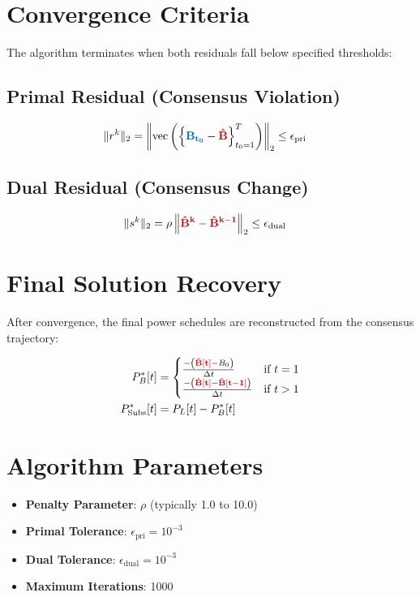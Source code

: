 \documentclass[11pt]{article}
\newcommand{\blueB}[1]{\textcolor{bluevar}{\mathbf{#1}}}      %
\newcommand{\redBhat}[1]{\textcolor{redvar}{\mathbf{#1}}}     %
\begin{document}
\section{Convergence Criteria}

The algorithm terminates when both residuals fall below specified thresholds:

\subsection{Primal Residual (Consensus Violation)}
\begin{align}
\|r^k\|_2 &= \left\| \text{vec}\left( \left\{ \blueB{B_{t_0}} - \redBhat{\hat{B}} \right\}_{t_0=1}^T \right) \right\|_2 \leq \epsilon_{\text{pri}}
\end{align}

\subsection{Dual Residual (Consensus Change)}
\begin{align}
\|s^k\|_2 &= \rho \left\| \redBhat{\hat{B}^k} - \redBhat{\hat{B}^{k-1}} \right\|_2 \leq \epsilon_{\text{dual}}
\end{align}

\section{Final Solution Recovery}

After convergence, the final power schedules are reconstructed from the consensus trajectory:

\begin{align}
P_{B}^*[t] &= 
\begin{cases}
\frac{-\left(\redBhat{\hat{B}[t]} - B_0\right)}{\Delta t} & \text{if } t = 1 \\
\frac{-\left(\redBhat{\hat{B}[t]} - \redBhat{\hat{B}[t-1]}\right)}{\Delta t} & \text{if } t > 1
\end{cases} \\
P_{\text{Subs}}^*[t] &= P_L[t] - P_{B}^*[t]
\end{align}

\section{Algorithm Parameters}

\begin{itemize}
    \item \textbf{Penalty Parameter}: $\rho$ (typically 1.0 to 10.0)
    \item \textbf{Primal Tolerance}: $\epsilon_{\text{pri}} = 10^{-3}$
    \item \textbf{Dual Tolerance}: $\epsilon_{\text{dual}} = 10^{-3}$
    \item \textbf{Maximum Iterations}: 1000
\end{itemize}
\end{document}
